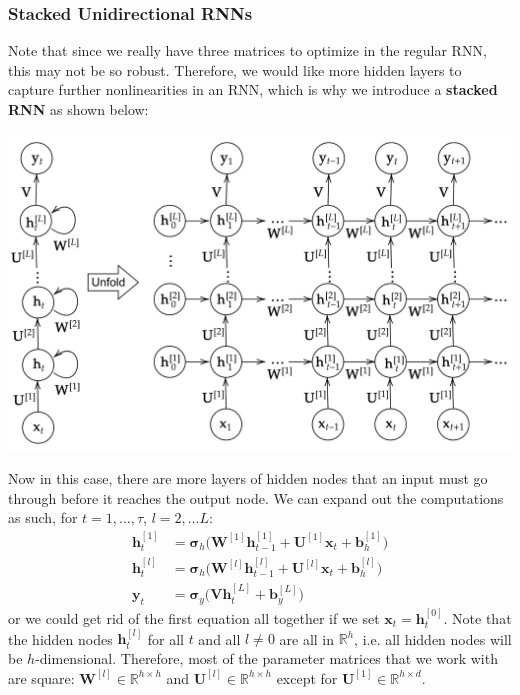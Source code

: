 \documentclass{article}
\theoremstyle{definition}
\theoremstyle{remark}
\theoremstyle{definition}
\begin{document}
\subsubsection{Stacked Unidirectional RNNs}

Note that since we really have three matrices to optimize in the regular RNN, this may not be so robust. Therefore, we would like more hidden layers to capture further nonlinearities in an RNN, which is why we introduce a \textbf{stacked RNN} as shown below: 
\begin{center}
    \includegraphics[scale=0.3]{img/RNNs/Multilayer_RNN.png}
\end{center}
Now in this case, there are more layers of hidden nodes that an input must go through before it reaches the output node. We can expand out the computations as such, for $t = 1, \ldots, \tau$, $l = 2, \ldots L$: 
\begin{align*}
    \mathbf{h}_t^{[1]} & = \boldsymbol{\sigma}_h \big( \mathbf{W}^{[1]} \mathbf{h}_{t-1}^{[1]} + \mathbf{U}^{[1]} \mathbf{x}_t + \mathbf{b}_h^{[1]} \big) \\
    \mathbf{h}_t^{[l]} & = \boldsymbol{\sigma}_h \big( \mathbf{W}^{[l]} \mathbf{h}_{t-1}^{[l]} + \mathbf{U}^{[l]} \mathbf{x}_t + \mathbf{b}_h^{[l]} \big) \\
    \mathbf{y}_t & = \boldsymbol{\sigma}_y \big( \mathbf{V} \mathbf{h}_t^{[L]} + \mathbf{b}_y^{[L]} \big) 
\end{align*}
or we could get rid of the first equation all together if we set $\mathbf{x}_t = \mathbf{h}_t^{[0]}$. Note that the hidden nodes $\mathbf{h}^{[l]}_t$ for all $t$ and all $l \neq 0$ are all in $\mathbb{R}^h$, i.e. all hidden nodes will be $h$-dimensional. Therefore, most of the parameter matrices that we work with are square: $\mathbf{W}^{[l]} \in \mathbb{R}^{h \times h}$ and $\mathbf{U}^{[l]} \in \mathbb{R}^{h \times h}$ except for $\mathbf{U}^{[1]} \in \mathbb{R}^{h \times d}$. 
\end{document}
